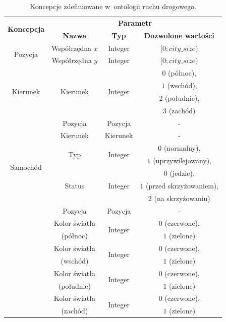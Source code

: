 \documentclass[a4paper,11pt]{article}
\begin{document}
\begin{table}[ht!]
    \centering
    \begin{tabular}{|c|c|c|c|}
        \hline
        \multirow{2}{*}{\textbf{Koncepcja}} & \multicolumn{3}{|c|}{\textbf{Parametr}} \\
        \cline{2-4}
        & \textbf{Nazwa} & \textbf{Typ} & \textbf{Dozwolone wartości} \\
        \hline
        \multirow{2}{*}{Pozycja} & Współrzędna $x$ & Integer & $[0;city\_size)$ \\
        \cline{2-4}
        & Współrzędna $y$ & Integer & $[0;city\_size)$ \\
        \hline
        \multirow{4}{*}{Kierunek} & \multirow{4}{*}{Kierunek} & \multirow{4}{*}{Integer} & $0$ (północ), \\
        &&& $1$ (wschód), \\
        &&& $2$ (południe), \\
        &&& $3$ (zachód) \\
        \hline
        \multirow{8}{*}{Samochód} & Pozycja & Pozycja & - \\
        \cline{2-4}
        & Kierunek & Kierunek & - \\
        \cline{2-4}
        & \multirow{2}{*}{Typ} & \multirow{2}{*}{Integer} & $0$ (normalny), \\
        &&& $1$ (uprzywilejowany), \\
        \cline{2-4}
        & \multirow{3}{*}{Status} & \multirow{3}{*}{Integer} & $0$ (jedzie), \\
        &&& $1$ (przed skrzyżowaniem), \\
        &&& $2$ (na skrzyżowaniu) \\
        \hline
        \multirow{9}{*}{Sygnalizacja} & Pozycja & Pozycja & - \\
        \cline{2-4}
        & Kolor światła & \multirow{2}{*}{Integer} & $0$ (czerwone), \\
        & (północ) & & $1$ (zielone) \\
        \cline{2-4}
        & Kolor światła & \multirow{2}{*}{Integer} & $0$ (czerwone), \\
        & (wschód) & & $1$ (zielone) \\
        \cline{2-4}
        & Kolor światła & \multirow{2}{*}{Integer} & $0$ (czerwone), \\
        & (południe) & & $1$ (zielone) \\
        \cline{2-4}
        & Kolor światła & \multirow{2}{*}{Integer} & $0$ (czerwone), \\
        & (zachód) & & $1$ (zielone) \\
        \cline{2-4}
        \hline
    \end{tabular}

    \caption{Koncepcje zdefiniowane w~ontologii ruchu drogowego.}
    \label{tab:concepts}
\end{table}
\end{document}
